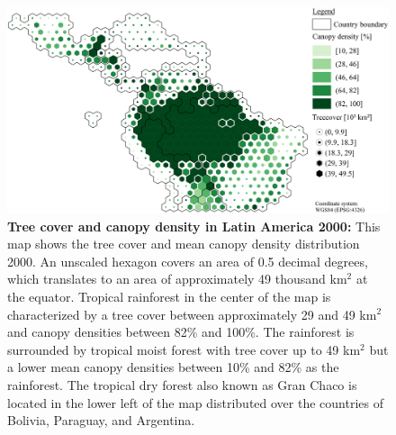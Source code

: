 			\begin{figure}[ht]
				\centering
				\includegraphics[scale=.91]{img/americas_treecover_frameless}
				\caption[Tree cover and canopy density in Latin America 2000]{\textbf{Tree cover and canopy density in Latin America 2000:} This map shows the tree cover and mean canopy density distribution 2000. An unscaled hexagon covers an area of 0.5 decimal degrees, which translates to an area of approximately 49 thousand km$^2$ at the equator. Tropical rainforest in the center of the map is characterized by a tree cover between approximately 29 and 49 km$^2$ and canopy densities between 82\% and 100\%. The rainforest is surrounded by tropical moist forest with tree cover up to 49 km$^2$ but a lower mean canopy densities between 10\% and 82\% as the rainforest. The tropical dry forest also known as Gran Chaco is located in the lower left of the map distributed over the countries of Bolivia, Paraguay, and Argentina.}
				\label{fig:americas_tree_cover}
			\end{figure}

